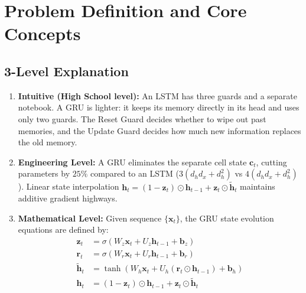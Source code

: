 \documentclass[11pt,a4paper]{article}
\theoremstyle{definition}
\begin{document}
\section{Problem Definition and Core Concepts}

\subsection{3-Level Explanation}
\begin{enumerate}
    \item \textbf{Intuitive (High School level):} An LSTM has three guards and a separate notebook. A GRU is lighter: it keeps its memory directly in its head and uses only two guards. The Reset Guard decides whether to wipe out past memories, and the Update Guard decides how much new information replaces the old memory.
    \item \textbf{Engineering Level:} A GRU eliminates the separate cell state $\mathbf{c}_t$, cutting parameters by $25\%$ compared to an LSTM ($3(d_h d_x + d_h^2)$ vs $4(d_h d_x + d_h^2)$). Linear state interpolation $\mathbf{h}_t = (1 - \mathbf{z}_t) \odot \mathbf{h}_{t-1} + \mathbf{z}_t \odot \tilde{\mathbf{h}}_t$ maintains additive gradient highways.
    \item \textbf{Mathematical Level:} Given sequence $\{\mathbf{x}_t\}$, the GRU state evolution equations are defined by:
    \begin{align}
    \mathbf{z}_t &= \sigma(W_z \mathbf{x}_t + U_z \mathbf{h}_{t-1} + \mathbf{b}_z) \\
    \mathbf{r}_t &= \sigma(W_r \mathbf{x}_t + U_r \mathbf{h}_{t-1} + \mathbf{b}_r) \\
    \tilde{\mathbf{h}}_t &= \tanh(W_h \mathbf{x}_t + U_h (\mathbf{r}_t \odot \mathbf{h}_{t-1}) + \mathbf{b}_h) \\
    \mathbf{h}_t &= (1 - \mathbf{z}_t) \odot \mathbf{h}_{t-1} + \mathbf{z}_t \odot \tilde{\mathbf{h}}_t
    \end{align}
\end{enumerate}
\end{document}
